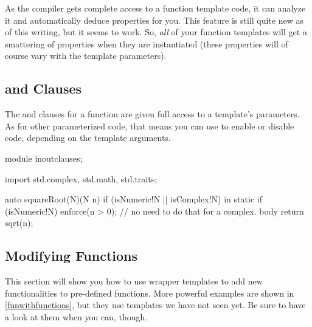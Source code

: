 As the compiler gets complete access to a function template code, it can analyze it and automatically deduce properties for you. This feature is still quite new as of this writing, but it seems to work. So, \emph{all} of your function templates will get a smattering of properties when they are instantiated (these properties will of course vary with the template parameters).

\subsection{\texorpdfstring{ and  Clauses}
                           {in and out Clauses}}
\label{inandoutclauses}

The  and  clauses for a function are given full access to a template's parameters. As for other parameterized code, that means you can use  to enable or disable code, depending on the template arguments.

\begin{dcode}
module inoutclauses;

import std.complex, std.math, std.traits;

auto squareRoot(N)(N n) if (isNumeric!N || isComplex!N)
in 
{
    static if (isNumeric!N)
        enforce(n > 0);
    // no need to do that for a complex.
}
body
{
    return sqrt(n);
}
\end{dcode}

\subsection{Modifying Functions}\label{modifyingfunctions}

This section will show you how to use wrapper templates to add new functionalities to pre-defined functions. More powerful examples are shown in \autoref{funwithfunctions}, but they use templates we have not seen yet. Be sure to have a look at them when you can, though.


